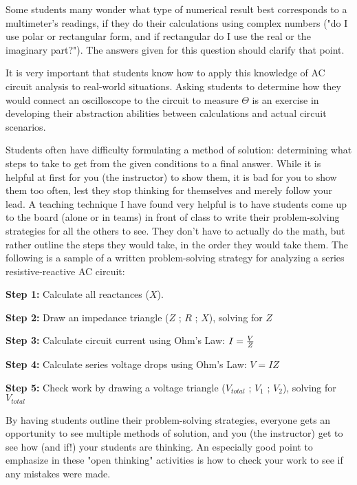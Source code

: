 
Some students many wonder what type of numerical result best corresponds to a multimeter's readings, if they do their calculations using complex numbers ("do I use polar or rectangular form, and if rectangular do I use the real or the imaginary part?").  The answers given for this question should clarify that point.

It is very important that students know how to apply this knowledge of AC circuit analysis to real-world situations.  Asking students to determine how they would connect an oscilloscope to the circuit to measure $\Theta$ is an exercise in developing their abstraction abilities between calculations and actual circuit scenarios.

\vskip 10pt

Students often have difficulty formulating a method of solution: determining what steps to take to get from the given conditions to a final answer.  While it is helpful at first for you (the instructor) to show them, it is bad for you to show them too often, lest they stop thinking for themselves and merely follow your lead.  A teaching technique I have found very helpful is to have students come up to the board (alone or in teams) in front of class to write their problem-solving strategies for all the others to see.  They don't have to actually do the math, but rather outline the steps they would take, in the order they would take them.  The following is a sample of a written problem-solving strategy for analyzing a series resistive-reactive AC circuit:

\vskip 10pt

\goodbreak

{\bf Step 1:} Calculate all reactances ($X$).

{\bf Step 2:} Draw an impedance triangle ($Z$ ; $R$ ; $X$), solving for $Z$

{\bf Step 3:} Calculate circuit current using Ohm's Law: $I = {V \over Z}$

{\bf Step 4:} Calculate series voltage drops using Ohm's Law: $V = {I Z}$

{\bf Step 5:} Check work by drawing a voltage triangle ($V_{total}$ ; $V_1$ ; $V_2$), solving for $V_{total}$

\vskip 10pt

By having students outline their problem-solving strategies, everyone gets an opportunity to see multiple methods of solution, and you (the instructor) get to see how (and if!) your students are thinking.  An especially good point to emphasize in these "open thinking" activities is how to check your work to see if any mistakes were made.




